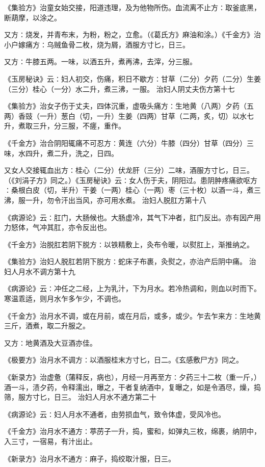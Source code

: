 \documentclass[a4paper,12pt,UTF8,twoside]{ctexbook}
\begin{document}
《集验方》治童女始交接，阳道违理，及为他物所伤。血流离不止方∶取釜底黑，断葫摩，以涂之。

又方∶烧发，并青布末，为粉，粉之，立愈。（《葛氏方》麻油和涂。）《千金方》治小户嫁痛方∶乌贼鱼骨二枚，烧为屑，酒服方寸匕，日三。

又方∶牛膝五两。一味，以酒五升，煮再沸，去滓，分三服。

《玉房秘诀》云∶妇人初交，伤痛，积日不歇方∶甘草（二分）夕药（二分）生姜（三分）桂心（一分）水二升，煮三沸，一服。
治妇人阴丈夫伤方第十七

《集验方》治女子伤于丈夫，四体沉重，虚吸头痛方∶生地黄（八两）夕药（五两）香豉（一升）葱白（切，一升）生姜（四两）甘草（二两，炙，切）以水七升，煮取三升，分三服，不瘥，重作。

《千金方》治合阴阳辄痛不可忍方∶黄连（六分）牛膝（四分）甘草（四分）三味，水四升，煮二升，洗之，日四。

又女人交接辄血出方∶桂心（二分）伏龙肝（三分）二味，酒服方寸匕，日三。（《刘涓子方》同之。）《玉房秘诀》云∶女人伤于夫，阴阳过。患阴肿疼痛欲呕方∶桑根白皮（切，半升）干姜（一两）桂心（一两）枣（三十枚）以酒一斗，煮三沸，服一升，勿令汗出当风，亦可用水煮。
治妇人脱肛方第十八

《病源论》云∶肛门，大肠候也。大肠虚冷，其气下冲者，肛门反出。亦有因产用力怒体，气冲其肛，亦令反出也。

《千金方》治脱肛若阴下脱方∶以铁精敷上，灸布令暖，以熨肛上，渐推纳之。

《集验方》治妇人脱肛若阴下脱方∶蛇床子布裹，灸熨之，亦治产后阴中痛。
治妇人月水不调方第十九

《病源论》云∶冲任之二经，上为乳汁，下为月水。若冷热调和，则血以时而下。寒温乖适，则月水乍多乍少，不调也。

《千金方》治月水不调，或在月前，或在月后，或多，或少。乍去乍来方∶生地黄三斤，酒煮，取二升服之。

又方∶地黄酒及大豆酒亦佳。

《极要方》治月水不调方∶以酒服桂末方寸匕，日二。《玄感敷尸方》同之。

《新录方》治虚惫（蒲释反，病也），月经一月再至方∶夕药三十二枚（重一斤，）酒一斗，渍夕药，令释濡出，曝之，干者复纳酒中，复曝之，如是令酒尽，燥，捣筛，服方寸匕，日三。
治妇人月水不通方第二十

《病源论》云∶妇人月水不通者，由劳损血气，致令体虚，受风冷也。

《千金方》治月水不通方∶葶苈子一升，捣，蜜和，如弹丸三枚，绵裹，纳阴中，入三寸，一宿易，有汁出止。

《新录方》治月水不通方∶麻子，捣绞取汁服，日三。
\end{document}
